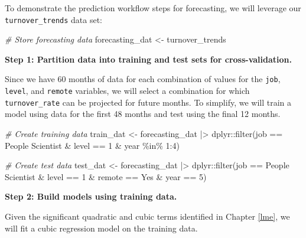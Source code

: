 \documentclass[
]{book}
\newenvironment{Shaded}{\begin{snugshade}}{\end{snugshade}}
\newcommand{\CommentTok}[1]{\textcolor[rgb]{0.56,0.35,0.01}{\textit{#1}}}
\newcommand{\DecValTok}[1]{\textcolor[rgb]{0.00,0.00,0.81}{#1}}
\newcommand{\FunctionTok}[1]{\textcolor[rgb]{0.00,0.00,0.00}{#1}}
\newcommand{\NormalTok}[1]{#1}
\newcommand{\OtherTok}[1]{\textcolor[rgb]{0.56,0.35,0.01}{#1}}
\newcommand{\SpecialCharTok}[1]{\textcolor[rgb]{0.00,0.00,0.00}{#1}}
\newcommand{\StringTok}[1]{\textcolor[rgb]{0.31,0.60,0.02}{#1}}
\begin{document}
To demonstrate the prediction workflow steps for forecasting, we will leverage our \texttt{turnover\_trends} data set:

\begin{Shaded}
\begin{Highlighting}[]
\CommentTok{\# Store forecasting data}
\NormalTok{forecasting\_dat }\OtherTok{\textless{}{-}}\NormalTok{ turnover\_trends}
\end{Highlighting}
\end{Shaded}

\textbf{Step 1: Partition data into training and test sets for cross-validation.}

Since we have 60 months of data for each combination of values for the \texttt{job}, \texttt{level}, and \texttt{remote} variables, we will select a combination for which \texttt{turnover\_rate} can be projected for future months. To simplify, we will train a model using data for the first 48 months and test using the final 12 months.

\begin{Shaded}
\begin{Highlighting}[]
\CommentTok{\# Create training data}
\NormalTok{train\_dat }\OtherTok{\textless{}{-}}\NormalTok{ forecasting\_dat }\SpecialCharTok{|\textgreater{}}\NormalTok{ dplyr}\SpecialCharTok{::}\FunctionTok{filter}\NormalTok{(job }\SpecialCharTok{==} \StringTok{\textquotesingle{}People Scientist\textquotesingle{}} \SpecialCharTok{\&}\NormalTok{ level }\SpecialCharTok{==} \DecValTok{1} \SpecialCharTok{\&}\NormalTok{ year }\SpecialCharTok{\%in\%} \DecValTok{1}\SpecialCharTok{:}\DecValTok{4}\NormalTok{)}

\CommentTok{\# Create test data}
\NormalTok{test\_dat }\OtherTok{\textless{}{-}}\NormalTok{ forecasting\_dat }\SpecialCharTok{|\textgreater{}}\NormalTok{ dplyr}\SpecialCharTok{::}\FunctionTok{filter}\NormalTok{(job }\SpecialCharTok{==} \StringTok{\textquotesingle{}People Scientist\textquotesingle{}} \SpecialCharTok{\&}\NormalTok{ level }\SpecialCharTok{==} \DecValTok{1} \SpecialCharTok{\&}\NormalTok{ remote }\SpecialCharTok{==} \StringTok{\textquotesingle{}Yes\textquotesingle{}} \SpecialCharTok{\&}\NormalTok{ year }\SpecialCharTok{==} \DecValTok{5}\NormalTok{)}
\end{Highlighting}
\end{Shaded}

\textbf{Step 2: Build models using training data.}

Given the significant quadratic and cubic terms identified in Chapter \ref{lme}, we will fit a cubic regression model on the training data.
\end{document}
